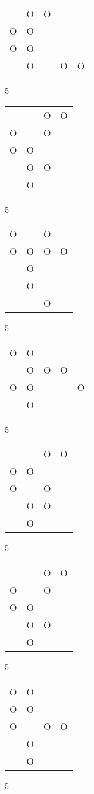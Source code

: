 \begin{tabular}{|m{0.2cm}m{0.2cm}m{0.2cm}m{0.2cm}m{0.2cm}|}\hline
 &O&O& & \\
O&O& & & \\
O&O& & & \\
 &O& &O&O\\
\hline\end{tabular}5
\begin{tabular}{|m{0.2cm}m{0.2cm}m{0.2cm}m{0.2cm}|}\hline
 & &O&O\\
O& &O& \\
O&O& & \\
 &O&O& \\
 &O& & \\
\hline\end{tabular}5
\begin{tabular}{|m{0.2cm}m{0.2cm}m{0.2cm}m{0.2cm}|}\hline
O& &O& \\
O&O&O&O\\
 &O& & \\
 &O& & \\
 & &O& \\
\hline\end{tabular}5
\begin{tabular}{|m{0.2cm}m{0.2cm}m{0.2cm}m{0.2cm}m{0.2cm}|}\hline
O&O& & & \\
 &O&O&O& \\
O&O& & &O\\
 &O& & & \\
\hline\end{tabular}5
\begin{tabular}{|m{0.2cm}m{0.2cm}m{0.2cm}m{0.2cm}|}\hline
 & &O&O\\
O&O& & \\
O& &O& \\
 &O&O& \\
 &O& & \\
\hline\end{tabular}5
\begin{tabular}{|m{0.2cm}m{0.2cm}m{0.2cm}m{0.2cm}|}\hline
 & &O&O\\
O& &O& \\
O&O& & \\
 &O&O& \\
 &O& & \\
\hline\end{tabular}5
\begin{tabular}{|m{0.2cm}m{0.2cm}m{0.2cm}m{0.2cm}|}\hline
O&O& & \\
O&O& & \\
O& &O&O\\
 &O& & \\
 &O& & \\
\hline\end{tabular}5
